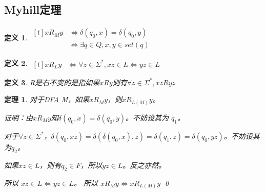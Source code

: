 \documentclass[twocolumn,zihao=5,linespread=1,heading=false,autoindent=0pt]{ctexart}
\theoremstyle{exampstyle} \newtheorem{definition}{定义}[section]
\theoremstyle{exampstyle} \newtheorem{example}{例}[section]
\theoremstyle{exampstyle} \newtheorem{theorem}{定理}[section]
\theoremstyle{exampstyle} \newtheorem{lemma}{引理}[section]
\theoremstyle{exampstyle} \newtheorem{myproof}{证明}[section]
\begin{document}
\subsection{Myhill定理}
\begin{definition}
    $\begin{aligned}[t]
        x R_M y & \iff \delta(q_0, x) = \delta(q_0, y) \\
            & \iff \exists q \in Q, x, y \in set(q)
    \end{aligned}$
\end{definition}
\begin{definition}
    $\begin{aligned}[t]
        x R_L y & \iff \forall z \in \Sigma^*, xz \in L \iff yz \in L
    \end{aligned}$
\end{definition}
\begin{definition}
    R是右不变的是指如果$xRy$则有$\forall z \in \Sigma^*, xzRyz$
\end{definition}
\begin{theorem}
    对于DFA M，如果$x R_M y$，则$x R_{L(M)} y$。
    
    证明：由$x R_M y$知$\delta(q_0, x) = \delta(q_0, y)$。不妨设其为
    $q_1$。

    对于$\forall z \in \Sigma^*$，$\delta(q_0, xz) =  \delta(\delta(q_0, x), z) = \delta(q_1, z) 
    = \delta(q_0, yz)$。不妨设其为$q_2$。

    如果$xz \in L$，则有$q_2 \in F$，所以$yz \in L$。反之亦然。

    所以 $xz \in L \iff yz \in L$。
    所以 $x R_M y \iff x R_{L(M)} y$
    \qed
\end{theorem}
\end{document}
